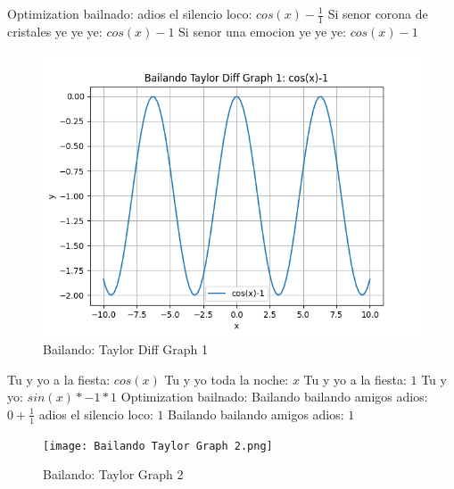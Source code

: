 \documentclass{article}
\begin{document}
 \newline \newline Optimization bailnado: \newline adios el silencio loco: $cos(x)-\frac{1}{1}$  \newline Si senor corona de cristales ye ye ye: $cos(x)-1$  \newline Si senor una emocion ye ye ye: $cos(x)-1$  \newline \begin{figure}
\centering
\includegraphics[width=0.8\linewidth]{Bailando Taylor Diff Graph 1.png}
\caption{Bailando: Taylor Diff Graph 1}
\label{fig:my_image}
\end{figure}
Tu y yo a la fiesta: $cos(x)$  \newline Tu y yo toda la noche: $x$ Tu y yo a la fiesta: $1$  \newline Tu y yo: $sin(x)*-1*1$  \newline \newline Optimization bailnado: \newline Bailando bailando amigos adios: $0+\frac{1}{1}$  \newline adios el silencio loco: $1$  \newline Bailando bailando amigos adios: $1$  \newline \begin{figure}
\centering
\texttt{[image: Bailando Taylor Graph 2.png]}
\caption{Bailando: Taylor Graph 2}
\label{fig:my_image}
\end{figure}
\end{document}
